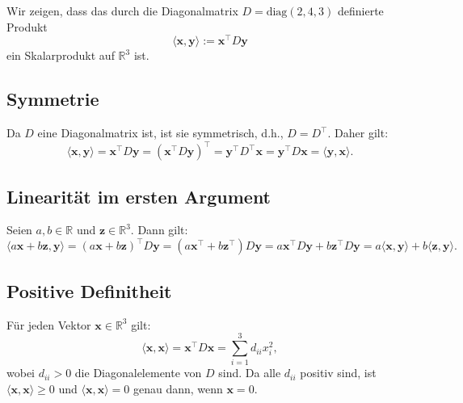 
Wir zeigen, dass das durch die Diagonalmatrix $D = \text{diag}(2, 4, 3)$ definierte Produkt
\[
\langle \mathbf{x}, \mathbf{y} \rangle := \mathbf{x}^\top D \mathbf{y}
\]
ein Skalarprodukt auf $\mathbb{R}^3$ ist.

\subsection*{Symmetrie}
Da $D$ eine Diagonalmatrix ist, ist sie symmetrisch, d.h., $D = D^\top$. Daher gilt:
\[
\langle \mathbf{x}, \mathbf{y} \rangle = \mathbf{x}^\top D \mathbf{y} = (\mathbf{x}^\top D \mathbf{y})^\top = \mathbf{y}^\top D^\top \mathbf{x} = \mathbf{y}^\top D \mathbf{x} = \langle \mathbf{y}, \mathbf{x} \rangle.
\]

\subsection*{Linearität im ersten Argument}
Seien $a, b \in \mathbb{R}$ und $\mathbf{z} \in \mathbb{R}^3$. Dann gilt:
\[
\langle a\mathbf{x} + b\mathbf{z}, \mathbf{y} \rangle = (a\mathbf{x} + b\mathbf{z})^\top D \mathbf{y} = (a\mathbf{x}^\top + b\mathbf{z}^\top) D \mathbf{y} = a\mathbf{x}^\top D \mathbf{y} + b\mathbf{z}^\top D \mathbf{y} = a\langle \mathbf{x}, \mathbf{y} \rangle + b\langle \mathbf{z}, \mathbf{y} \rangle.
\]

\subsection*{Positive Definitheit}
Für jeden Vektor $\mathbf{x} \in \mathbb{R}^3$ gilt:
\[
\langle \mathbf{x}, \mathbf{x} \rangle = \mathbf{x}^\top D \mathbf{x} = \sum_{i=1}^3 d_{ii} x_i^2,
\]
wobei $d_{ii} > 0$ die Diagonalelemente von $D$ sind. Da alle $d_{ii}$ positiv sind, ist $\langle \mathbf{x}, \mathbf{x} \rangle \geq 0$ und $\langle \mathbf{x}, \mathbf{x} \rangle = 0$ genau dann, wenn $\mathbf{x} = 0$.
